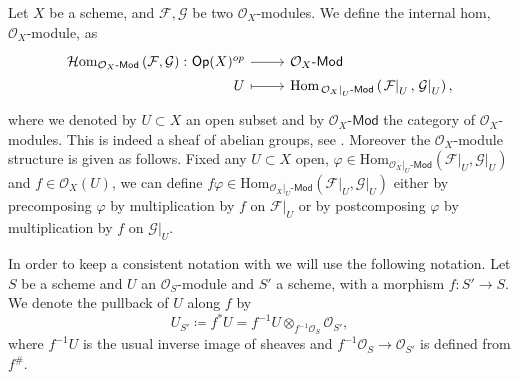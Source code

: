 \documentclass[../Main]{subfiles}
\begin{document}
\begin{defn}\label{defn:iHomOXMod}
	Let $X$ be a scheme, and $\mathcal{F}, \mathcal{G}$ be two $\mathcal{O}_{ X }$-modules.
	We define the internal hom, $\mathcal{O}_{ X }$-module, as
	\begin{equation*}
	\begin{tikzcd}[row sep = 0ex
		,/tikz/column 1/.append style={anchor=base east}
		,/tikz/column 2/.append style={anchor=base west}]
		\mathcal{H}\mathrm{om}_{ \mathcal{O}_{ X }\text{-}\mathsf{Mod} }
		\left( \mathcal{F}, \mathcal{G} \right)\colon 
		\mathsf{Op}(X)^{op} \arrow[r, "", rightarrow] &
		\mathcal{O}_{ X }\text{-}\mathsf{Mod} \\
		U \arrow[r, "", mapsto] & 
		\mathrm{Hom}_{ \left.\mathcal{O}_{ X }\right|_{U}\text{-}\mathsf{Mod} } 
			\left( \left.\mathcal{F}\right|_{U}, \left.\mathcal{G}\right|_{U} \right)
	,\end{tikzcd}
	\end{equation*} 
	where we denoted by $U \subset X$ an open subset and by
	$\mathcal{O}_{ X }\text{-}\mathsf{Mod}$ the category of $\mathcal{O}_{ X }$-modules.
	This is indeed a sheaf of abelian groups, see 
	\cite[\href{https://stacks.math.columbia.edu/tag/00AK}{Section 00AK}]{SP}.
	Moreover the $\mathcal{O}_{ X }$-module structure is given as follows.
	Fixed any $U \subset X$ open, 
	$\varphi \in \mathrm{Hom}_{ \left.\mathcal{O}_{ X }\right|_{U}\text{-}\mathsf{Mod}} 
	\left( \left.\mathcal{F}\right|_{U} , \left.\mathcal{G}\right|_{U} \right)$ and
	$f \in \mathcal{O}_{ X }(U)$, we can define $f \varphi \in
	\mathrm{Hom}_{ \left.\mathcal{O}_{ X }\right|_{U}\text{-}\mathsf{Mod}  } 
	\left( \left.\mathcal{F}\right|_{U} , \left.\mathcal{G}\right|_{U} \right)$
	either by precomposing $\varphi$ by multiplication
	by $f$ on $\left.\mathcal{F}\right|_{U}$ or by postcomposing $\varphi$
	by multiplication by $f$ on $\left.\mathcal{G}\right|_{U}$.
\end{defn}


\begin{ntt}[]
	In order to keep a consistent notation with
	\cite{Messing} we will use the following notation.
	Let $S$ be a scheme and $U$ an $\mathcal{O}_{ S }$-module
	and $S'$ a scheme, with a morphism
	$f\colon S' \to S$.
	We denote the pullback of $U$ along $f$ by 
	\begin{equation*}
	U_{S'} \coloneqq f^*U = 
	f^{-1}U \otimes_{f^{-1}\mathcal{O}_{ S }} \mathcal{O}_{ S' }
	,\end{equation*}
	where $f^{-1} U$ is the usual inverse image of sheaves and
	$f^{-1}\mathcal{O}_{ S } \to \mathcal{O}_{ S' }$ is defined from $f^\#$.
\end{ntt}
\end{document}
